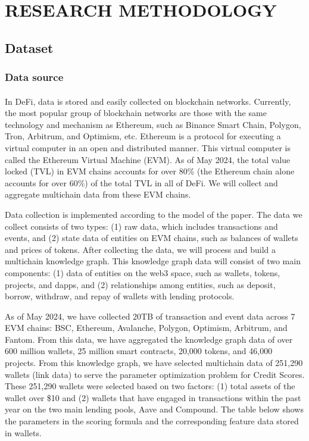 \documentclass[../ICIT-Paper-2024.tex]{subfiles}
\begin{document}
\section{RESEARCH METHODOLOGY}
\subsection{Dataset}
\subsubsection{Data source}
\paragraph{}
In DeFi, data is stored and easily collected on blockchain networks. Currently, the most popular group of blockchain networks are those with the same technology and mechanism as Ethereum, such as Binance Smart Chain, Polygon, Tron, Arbitrum, and Optimism, etc. Ethereum is a protocol for executing a virtual computer in an open and distributed manner. This virtual computer is called the Ethereum Virtual Machine (EVM). As of May 2024, the total value locked (TVL) in EVM chains accounts for over 80\% (the Ethereum chain alone accounts for over 60\%) of the total TVL in all of DeFi. We will collect and aggregate multichain data from these EVM chains. 

Data collection is implemented according to the model of the paper. The data we collect consists of two types: (1) raw data, which includes transactions and events, and (2) state data of entities on EVM chains, such as balances of wallets and prices of tokens. After collecting the data, we will process and build a multichain knowledge graph. This knowledge graph data will consist of two main components: (1) data of entities on the web3 space, such as wallets, tokens, projects, and dapps, and (2) relationships among entities, such as deposit, borrow, withdraw, and repay of wallets with lending protocols.

As of May 2024, we have collected 20TB of transaction and event data across 7 EVM chains: BSC, Ethereum, Avalanche, Polygon, Optimism, Arbitrum, and Fantom. From this data, we have aggregated the knowledge graph data of over 600 million wallets, 25 million smart contracts, 20,000 tokens, and 46,000 projects. From this knowledge graph, we have selected multichain data of 251,290 wallets (link data) to serve the parameter optimization problem for Credit Scores. These 251,290 wallets were selected based on two factors: (1) total assets of the wallet over \$10 and (2) wallets that have engaged in transactions within the past year on the two main lending pools, Aave and Compound. The table below shows the parameters in the scoring formula and the corresponding feature data stored in wallets.
\end{document}
